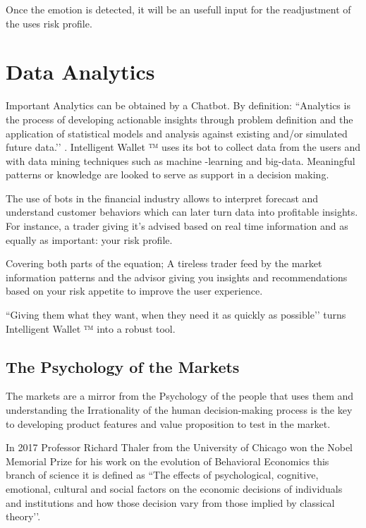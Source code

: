 \documentclass[	DIV=calc,%
							paper=letter,%
							fontsize=12pt%
                            ]{scrartcl}	 					%
\begin{document}
Once the emotion is detected, it will be an usefull input for the readjustment of the uses risk profile.

\section{\label{sec:level1}Data Analytics}
Important Analytics can be obtained by a Chatbot. By definition: ``Analytics is the process of developing actionable insights through problem definition and the application of statistical models and analysis against existing and/or simulated future data.’’ \cite{cooper2012analytics_20519214}. Intelligent Wallet ™ uses its bot to collect data from the users and with data mining techniques such as machine -learning and big-data.  Meaningful patterns or knowledge are looked to serve as support in a decision making.\cite{russom2011big_201604201807}

The use of bots in the financial industry allows to interpret forecast and understand customer behaviors which can later turn data into profitable insights. For instance, a trader giving it's advised based on real time information and as equally as important: your risk profile.

Covering both parts of the equation; A tireless trader feed by the market information patterns and the advisor giving you insights and recommendations based on your risk appetite to improve the user experience.

 ``Giving them what they want, when they need it as quickly as possible’’ turns Intelligent Wallet ™ into a robust tool.

\subsection{\label{sec:level1}The Psychology of the Markets}

The markets are a mirror from the Psychology of the people that uses them and understanding the Irrationality of the human decision-making process is the key to developing product features and value proposition to test in the market.\cite{do2011behavioral_22029239}

In 2017 Professor Richard Thaler from the University of Chicago won the Nobel Memorial Prize for his work on the evolution of Behavioral Economics this branch of science it is defined as ``The effects of psychological, cognitive, emotional, cultural and social factors on the economic decisions of individuals and institutions and how those decision vary from those implied by classical theory’’.\cite{appelbaum2017nobel_sn}
\end{document}
